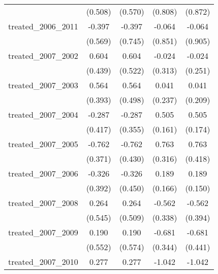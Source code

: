 {\begin{tabular}{l*{4}{c}}
            &     (0.508)         &     (0.570)         &     (0.808)         &     (0.872)         \\
[1em]
treated\_2006\_2011&      -0.397         &      -0.397         &      -0.064         &      -0.064         \\
            &     (0.569)         &     (0.745)         &     (0.851)         &     (0.905)         \\
[1em]
treated\_2007\_2002&       0.604         &       0.604         &      -0.024         &      -0.024         \\
            &     (0.439)         &     (0.522)         &     (0.313)         &     (0.251)         \\
[1em]
treated\_2007\_2003&       0.564         &       0.564         &       0.041         &       0.041         \\
            &     (0.393)         &     (0.498)         &     (0.237)         &     (0.209)         \\
[1em]
treated\_2007\_2004&      -0.287         &      -0.287         &       0.505\sym{**} &       0.505\sym{**} \\
            &     (0.417)         &     (0.355)         &     (0.161)         &     (0.174)         \\
[1em]
treated\_2007\_2005&      -0.762\sym{*}  &      -0.762         &       0.763\sym{*}  &       0.763         \\
            &     (0.371)         &     (0.430)         &     (0.316)         &     (0.418)         \\
[1em]
treated\_2007\_2006&      -0.326         &      -0.326         &       0.189         &       0.189         \\
            &     (0.392)         &     (0.450)         &     (0.166)         &     (0.150)         \\
[1em]
treated\_2007\_2008&       0.264         &       0.264         &      -0.562         &      -0.562         \\
            &     (0.545)         &     (0.509)         &     (0.338)         &     (0.394)         \\
[1em]
treated\_2007\_2009&       0.190         &       0.190         &      -0.681\sym{*}  &      -0.681         \\
            &     (0.552)         &     (0.574)         &     (0.344)         &     (0.441)         \\
[1em]
treated\_2007\_2010&       0.277         &       0.277         &      -1.042\sym{*}  &      -1.042\sym{*}  \\

\end{tabular}}
